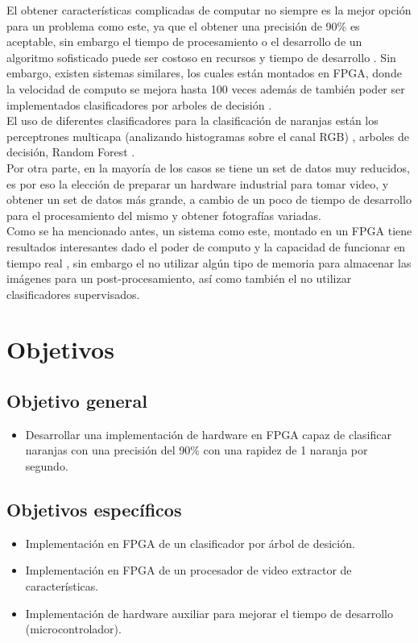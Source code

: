 \documentclass[twoside,spanish,ESP,MSc]{plantillaLabUPV}
\theoremstyle{definition}
\begin{document}
El obtener características complicadas de computar no siempre es la mejor opción para un problema como este, ya que el obtener una precisión de 90\% es aceptable, sin embargo el tiempo de procesamiento o el desarrollo de un algoritmo sofisticado puede ser costoso en recursos y tiempo de desarrollo \cite{curvelet}. Sin embargo, existen sistemas similares, los cuales están montados en FPGA, donde la velocidad de computo se mejora hasta 100 veces \cite{faste} además de también poder ser implementados clasificadores por arboles de decisión \cite{friend}.\\

El uso de diferentes clasificadores para la clasificación de naranjas están los perceptrones multicapa (analizando histogramas sobre el canal RGB) \cite{classi,analis}, arboles de decisión, Random Forest \cite{analis,rfrf}. \\

Por otra parte, en la mayoría de los casos se tiene un set de datos muy reducidos, es por eso la elección de preparar un hardware industrial para tomar video, y obtener un set de datos más grande, a cambio de un poco de tiempo de desarrollo para el procesamiento del mismo y obtener fotografías variadas.\\

Como se ha mencionado antes, un sistema como este, montado en un FPGA tiene resultados interesantes dado el poder de computo y la capacidad de funcionar en tiempo real \cite{josu}, sin embargo el no utilizar algún tipo de memoria para almacenar las imágenes para un post-procesamiento, así como también el no utilizar clasificadores supervisados.


\section{Objetivos}
\subsection*{Objetivo general}
\begin{itemize}
 \item Desarrollar una implementación de hardware en FPGA capaz de clasificar naranjas con una precisión del 90\% con una rapidez de 1 naranja por segundo.
\end{itemize}

\subsection*{Objetivos específicos}
\begin{itemize}
 \item Implementación en FPGA de un clasificador por árbol de desición.
 \item Implementación en FPGA de un procesador de video extractor de características.
 \item Implementación de hardware  auxiliar para mejorar el tiempo de desarrollo (microcontrolador).

\end{itemize}
\end{document}
